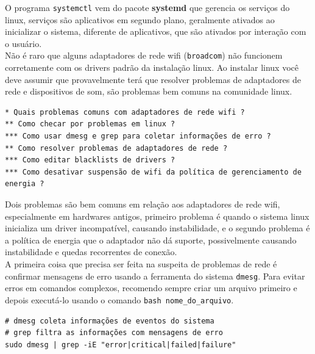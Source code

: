 \documentclass[12pt,a4paper]{article}
\begin{document}
\vspace{\baselineskip}

O programa \texttt{systemctl} vem do pacote \textbf{systemd} que gerencia os serviços do linux, serviços são aplicativos em segundo plano, geralmente ativados ao inicializar o sistema, diferente de aplicativos, que são ativados por interação com o usuário.\\

Não é raro que alguns adaptadores de rede wifi (\texttt{broadcom}) não funcionem corretamente com os drivers padrão da instalação linux. Ao instalar linux você deve assumir que provavelmente terá que resolver problemas de adaptadores de rede e dispositivos de som, são problemas bem comuns na comunidade linux.\\

\begin{lstlisting}
* Quais problemas comuns com adaptadores de rede wifi ?
** Como checar por problemas em linux ?
*** Como usar dmesg e grep para coletar informações de erro ? 
** Como resolver problemas de adaptadores de rede ?
*** Como editar blacklists de drivers ?
*** Como desativar suspensão de wifi da política de gerenciamento de energia ?
\end{lstlisting}

\vspace{\baselineskip}

Dois problemas são bem comuns em relação aos adaptadores de rede wifi, especialmente em hardwares antigos, primeiro problema é quando o sistema linux inicializa um driver incompatível, causando instabilidade, e o segundo problema é a política de energia que o adaptador não dá suporte, possivelmente causando instabilidade e quedas recorrentes de conexão. \\

A primeira coisa que precisa ser feita na suspeita de problemas de rede é confirmar mensagens de erro usando a ferramenta do sistema \texttt{dmesg}. Para evitar erros em comandos complexos, recomendo sempre criar um arquivo primeiro e depois executá-lo usando o comando \texttt{bash nome\_do\_arquivo}. \\

\begin{lstlisting}
# dmesg coleta informações de eventos do sistema 
# grep filtra as informações com mensagens de erro 
sudo dmesg | grep -iE "error|critical|failed|failure" 
\end{lstlisting}

\vspace{\baselineskip}
\end{document}
